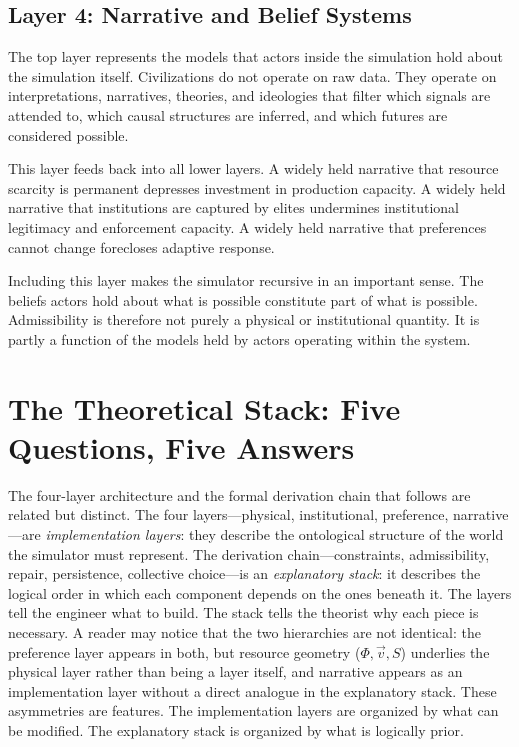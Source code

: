 \documentclass[12pt]{article}
\begin{document}
\subsection{Layer 4: Narrative and Belief Systems}

The top layer represents the models that actors inside the simulation hold about the simulation itself. Civilizations do not operate on raw data. They operate on interpretations, narratives, theories, and ideologies that filter which signals are attended to, which causal structures are inferred, and which futures are considered possible.

This layer feeds back into all lower layers. A widely held narrative that resource scarcity is permanent depresses investment in production capacity. A widely held narrative that institutions are captured by elites undermines institutional legitimacy and enforcement capacity. A widely held narrative that preferences cannot change forecloses adaptive response.

Including this layer makes the simulator recursive in an important sense. The beliefs actors hold about what is possible constitute part of what is possible. Admissibility is therefore not purely a physical or institutional quantity. It is partly a function of the models held by actors operating within the system.

\section{The Theoretical Stack: Five Questions, Five Answers}

The four-layer architecture and the formal derivation chain that follows are related but distinct. The four layers---physical, institutional, preference, narrative---are \emph{implementation layers}: they describe the ontological structure of the world the simulator must represent. The derivation chain---constraints, admissibility, repair, persistence, collective choice---is an \emph{explanatory stack}: it describes the logical order in which each component depends on the ones beneath it. The layers tell the engineer what to build. The stack tells the theorist why each piece is necessary. A reader may notice that the two hierarchies are not identical: the preference layer appears in both, but resource geometry ($\Phi, \vec{v}, S$) underlies the physical layer rather than being a layer itself, and narrative appears as an implementation layer without a direct analogue in the explanatory stack. These asymmetries are features. The implementation layers are organized by what can be modified. The explanatory stack is organized by what is logically prior.
\end{document}
